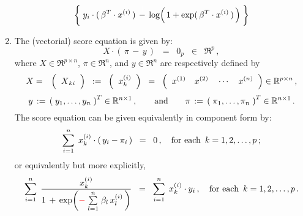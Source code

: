 \begin{proposition}
\begin{enumerate}
\begin{eqnarray*}
		\left\{\;
			y_{i}\cdot(\,\beta^{T} \cdot x^{(i)}\,)
			\, \overset{{\color{white}\vert}}{-} \,
			\log\!\left(\,1 + \exp(\,\beta^{T} \cdot x^{(i)}\,)\,\right)
			\;\right\}
	\end{eqnarray*}
\item
	The (vectorial) score equation is given by:
	\begin{equation*}
	X \cdot \left(\, \pi \,-\, y\,\right) \;\; = \;\; 0_{p} \;\; \in \;\; \Re^{p}\,,
	\end{equation*}
	where $X \in \Re^{p \times n}$, $\pi \in \Re^{n}$, and $y \in \Re^{n}$ are respectively defined by
	\begin{eqnarray*}
	X
	&=&
		\left(\;\;\overset{{\color{white}.}}{X}_{ki}\;\;\right)
	\;\;:=\;\;
		\left(\;\; x^{(i)}_{k} \;\;\right)
	\;\;=\;\;
		\left(\;\; x^{(1)} \quad x^{(2)} \quad \cdots \quad x^{(n)} \;\;\right) \in \Re^{p \times n}\,,
	\end{eqnarray*}
	\begin{equation*}
	y \,:=\, \left(\;y_{1},\ldots,y_{n}\;\right)^{T} \in \Re^{n \times 1}\,, 
	\quad\quad
	\textnormal{and}	
	\quad\quad
	\pi \,:=\, \left(\;\pi_{1},\ldots,\pi_{n}\;\right)^{T} \in \Re^{n \times 1}\,.
	\end{equation*}
	The score equation can be given equivalently in component form by:
	\begin{equation*}
	\overset{n}{\underset{i=1}{\sum}}\;\, x^{(i)}_{k} \cdot \left(\,y_{i} - \pi_{i}\,\right)
	\;\; = \;\; 0\,,
	\quad
	\textnormal{for each \,$k = 1, 2,\ldots,p$}\,;
	\end{equation*}
	or equivalently but more explicitly,
	\begin{equation*}
	\overset{n}{\underset{i=1}{\sum}}\;\,
	\dfrac{x^{(i)}_{k}}{1 \,+\, \exp\!\left({\color{red}-}\;\overset{n}{\underset{l=1}{\sum}}\;\beta_{l}\,x^{(i)}_{l}\,\right)}
	\;\; = \;\;
	\overset{n}{\underset{i=1}{\sum}}\;\, x^{(i)}_{k} \cdot y_{i}\,,
	\quad
	\textnormal{for each \,$k = 1, 2,\ldots,p$}\,.
	\end{equation*}
\end{enumerate}
\end{proposition}
\proof
